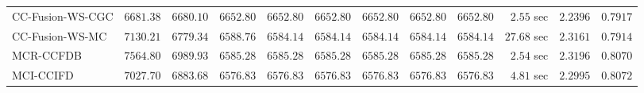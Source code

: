 \begin{table}[H]
\begin{tabular}{lrrrrrrrrrrr}
    CC-Fusion-WS-CGC & $      6681.38$ & $      6680.10$ & $      6652.80$ & $      6652.80$ & $      6652.80$ & $      6652.80$ & $      6652.80$ & $      6652.80$ & $         2.55$ sec    & $       2.2396$  & $       0.7917$ \\ 
     CC-Fusion-WS-MC & $      7130.21$ & $      6779.34$ & $      6588.76$ & $      6584.14$ & $      6584.14$ & $      6584.14$ & $      6584.14$ & $      6584.14$ & $        27.68$ sec    & $       2.3161$  & $       0.7914$ \\ 
\cmidrule{1-1} 
           MCR-CCFDB & $      7564.80$ & $      6989.93$ & $      6585.28$ & $      6585.28$ & $      6585.28$ & $      6585.28$ & $      6585.28$ & $      6585.28$ & $         2.54$ sec    & $       2.3196$  & $       0.8070$ \\ 
\cmidrule{1-1} 
           MCI-CCIFD & $      7027.70$ & $      6883.68$ & $      6576.83$ & $      6576.83$ & $      6576.83$ & $      6576.83$ & $      6576.83$ & $      6576.83$ & $         4.81$ sec    & $       2.2995$  & $       0.8072$ \\ 
\bottomrule
\end{tabular}
\end{table}


